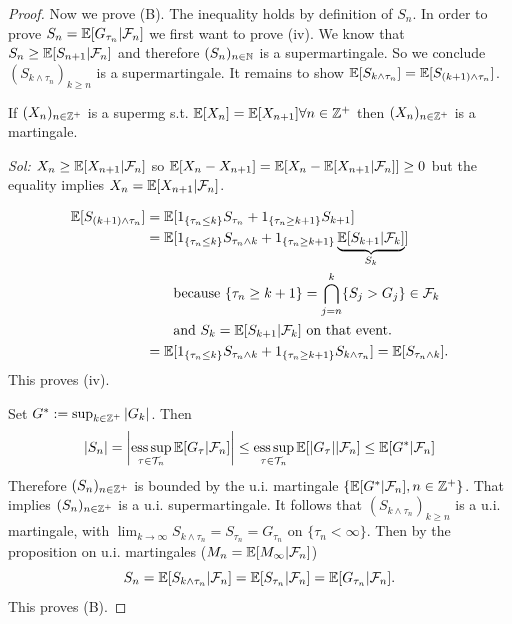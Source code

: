\begin{proof}
    Now we prove (B). The inequality holds by definition of $S_n$.
    In order to prove $S_n = \mathbb E[G_{\tau_n} | \mathcal{F}_n]$ we first want to prove (iv).
    We know that $S_n \ge \mathbb E[S_{n+1} | \mathcal{F}_n]$ and therefore $(S_n)_{n \in \mathbb N}$ is a supermartingale.
    So we conclude $(S_{k \wedge \tau_n})_{k \ge n}$ is a supermartingale.
    It remains to show $\mathbb E[S_{k \wedge \tau_n}] = \mathbb E[S_{(k+1) \wedge \tau_n}]$.

    \begin{homework}
        If $(X_n)_{n \in \mathbb Z^+}$ is a supermg s.t. $\mathbb E[X_n] = \mathbb E[X_{n+1}] \forall n \in \mathbb Z^+$ then $(X_n)_{n \in \mathbb Z^+}$ is a martingale.
        
        \textit{Sol:} $X_n \ge \mathbb E[X_{n+1} | \mathcal{F}_n]$ so $\mathbb E[X_n - X_{n+1}] = \mathbb E[X_n - \mathbb E[X_{n+1} | \mathcal{F}_n]] \ge 0$ but the equality implies $X_n = \mathbb E[X_{n+1} | \mathcal{F}_n]$.
    \end{homework}

    \begin{align*}
        \mathbb E[S_{(k+1) \wedge \tau_n}] &= \mathbb E[1_{\{\tau_n \le k\}} S_{\tau_n} + 1_{\{\tau_n \ge k+1\}} S_{k+1}] \\
        &= \mathbb E[1_{\{\tau_n \le k\}} S_{\tau_n \wedge k} + 1_{\{\tau_n \ge k+1\}} \underbrace{\mathbb E[S_{k+1} | \mathcal{F}_k]}_{S_k}] \\
        &\qquad \text{because } \{\tau_n \ge k+1\} = \bigcap_{j=n}^k \{S_j > G_j\} \in \mathcal{F}_k \\
        &\qquad \text{and } S_k = \mathbb E[S_{k+1} | \mathcal{F}_k] \text{ on that event.} \\
        &= \mathbb E[1_{\{\tau_n \le k\}} S_{\tau_n \wedge k} + 1_{\{\tau_n \ge k+1\}} S_{k \wedge \tau_n}] = \mathbb E[S_{\tau_n \wedge k}].
    \end{align*}
    This proves (iv).

    Set $G^* := \sup_{k \in \mathbb Z^+} |G_k|$. Then
    $$|S_n| = \left| \operatorname*{ess\,sup}_{\tau \in \mathcal{T}_n} \mathbb E[G_\tau | \mathcal{F}_n] \right| \le \operatorname*{ess\,sup}_{\tau \in \mathcal{T}_n} \mathbb E[|G_\tau| | \mathcal{F}_n] \le \mathbb E[G^* | \mathcal{F}_n]$$
    Therefore $(S_n)_{n \in \mathbb Z^+}$ is bounded by the u.i. martingale $\{\mathbb E[G^* | \mathcal{F}_n], n \in \mathbb Z^+\}$. That implies $(S_n)_{n \in \mathbb Z^+}$ is a u.i. supermartingale. It follows that $(S_{k \wedge \tau_n})_{k \ge n}$ is a u.i. martingale, with $\lim_{k \to \infty} S_{k \wedge \tau_n} = S_{\tau_n} = G_{\tau_n}$ on $\{\tau_n < \infty\}$. Then by the proposition on u.i. martingales ($M_n = \mathbb E[M_\infty | \mathcal{F}_n]$)
    $$S_n = \mathbb E[S_{k \wedge \tau_n} | \mathcal{F}_n] = \mathbb E[S_{\tau_n} | \mathcal{F}_n] = \mathbb E[G_{\tau_n} | \mathcal{F}_n].$$
    This proves (B).


\end{proof}

